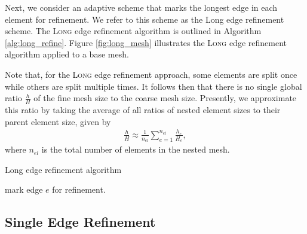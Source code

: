 Next, we consider an adaptive scheme that marks
the longest edge in each element for refinement.
We refer to this scheme as the Long edge
refinement scheme. The \textsc{Long} edge refinement
algorithm is outlined in Algorithm \ref{alg:long_refine}.
Figure \ref{fig:long_mesh} illustrates the
\textsc{Long} edge refinement algorithm applied to
a base mesh.

Note that, for the \textsc{Long} edge refinement
approach, some elements are split once while others
are split multiple times. It follows then that there is
no single global ratio $\frac{h}{H}$ of the fine mesh size
to the coarse mesh size. Presently, we approximate
this ratio by taking the average of all ratios
of nested element sizes to their parent element
size, given by
%
\begin{gather}
\frac{h}{H} \approx \frac{1}{n_{el}}
\sum_{e=1}^{n_{el}} \frac{h_e}{H_e},
\label{eq:refine_ratio}
\end{gather}
%
where $n_{el}$ is the total number of elements
in the nested mesh.

\begin{algorithm}
\caption{Long edge refinement algorithm}
\begin{algorithmic}
\State mark edge $e$ for refinement.
\EndIf
\EndFor
\EndFor
\end{algorithmic}
\label{alg:long_refine}
\end{algorithm}

\subsection{Single Edge Refinement}

